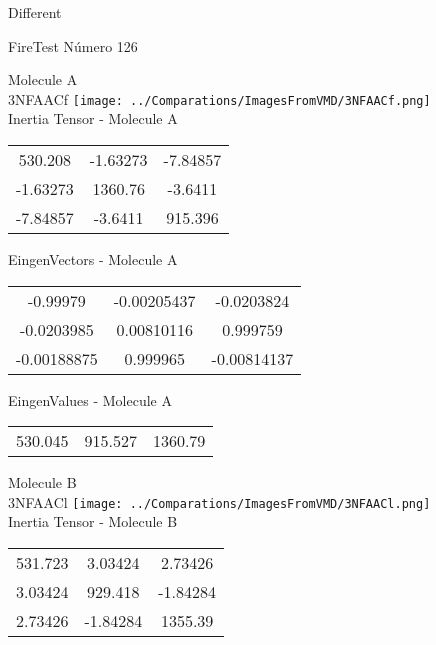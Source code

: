 \begin{center}
\vtab
\vtab
\textcolor{NavyBlue}{\Large Different}
\end{center}

 \newpage

\vtab[-2cm]
\begin{center}
{\large FireTest \tab Número 126}
\end{center}
\begin{multicols}{2}
\begin{center}

Molecule A \\ 
3NFAACf
\texttt{[image: ../Comparations/ImagesFromVMD/3NFAACf.png]}
\\
Inertia Tensor - Molecule A \\
\vtab

\begin{tabular}{|c c c|}
530.208	 & 	-1.63273	 & 	-7.84857	 \\
-1.63273	 & 	1360.76	 & 	-3.6411	 \\
-7.84857	 & 	-3.6411	 & 	915.396
\end{tabular}

\vtab
 EingenVectors - Molecule A     \\
\vtab
\begin{tabular}{|c c c|}
-0.99979	 & 	-0.00205437	 & 	-0.0203824	 \\
-0.0203985	 & 	0.00810116	 & 	0.999759	 \\
-0.00188875	 & 	0.999965	 & 	-0.00814137
\end{tabular}

\vtab
 EingenValues - Molecule A     \\
\vtab
\begin{tabular}{|c c c|}
530.045	 & 	915.527	 & 	1360.79	 \\
\end{tabular}
\columnbreak

Molecule B \\ 
3NFAACl
\texttt{[image: ../Comparations/ImagesFromVMD/3NFAACl.png]}
\\
Inertia Tensor - Molecule B \\
\vtab

\begin{tabular}{|c c c|}
531.723	 & 	3.03424	 & 	2.73426	 \\
3.03424	 & 	929.418	 & 	-1.84284	 \\
2.73426	 & 	-1.84284	 & 	1355.39
\end{tabular}


\end{center}
\end{multicols}
